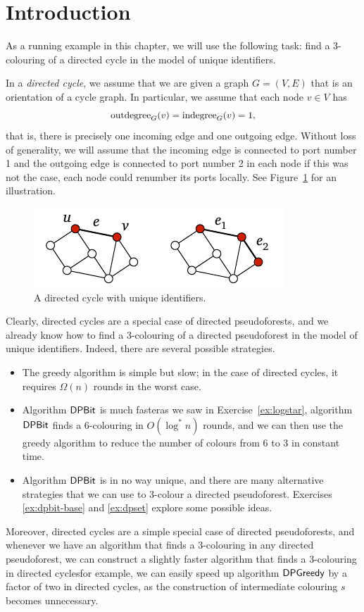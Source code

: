 \section{Introduction}

As a running example in this chapter, we will use the following task: find a $3$-colouring of a directed cycle in the model of unique identifiers.

In a \emph{directed cycle}, we assume that we are given a graph $G = (V,E)$ that is an orientation of a cycle graph. In particular, we assume that each node $v \in V$ has
\[
    \operatorname{outdegree}_G(v) = \operatorname{indegree}_G(v) = 1,
\]
that is, there is precisely one incoming edge and one outgoing edge. Without loss of generality, we will assume that the incoming edge is connected to port number 1 and the outgoing edge is connected to port number 2 in each node \mydash if this was not the case, each node could renumber its ports locally. See Figure~\ref{fig:directed-cycle} for an illustration.

\begin{figure}
    \centering
    \includegraphics[page=\PDirectedCycle]{figs.pdf}
    \caption{A directed cycle with unique identifiers.}\label{fig:directed-cycle}
\end{figure}

Clearly, directed cycles are a special case of directed pseudoforests, and we already know how to find a $3$-colouring of a directed pseudoforest in the model of unique identifiers. Indeed, there are several possible strategies.
\begin{itemize}
    \item The greedy algorithm is simple but slow; in the case of directed cycles, it requires $\Omega(n)$ rounds in the worst case.
    \item Algorithm $\textsf{DPBit}$ is much faster\mydash as we saw in Exercise~\ref{ex:logstar}, algorithm $\textsf{DPBit}$ finds a $6$-colouring in $O(\log^* n)$ rounds, and we can then use the greedy algorithm to reduce the number of colours from $6$ to $3$ in constant time.
    \item Algorithm $\textsf{DPBit}$ is in no way unique, and there are many alternative strategies that we can use to $3$-colour a directed pseudoforest. Exercises \ref{ex:dpbit-base} and \ref{ex:dpset} explore some possible ideas.
\end{itemize}
Moreover, directed cycles are a simple special case of directed pseudoforests, and whenever we have an algorithm that finds a $3$-colouring in any directed pseudoforest, we can construct a slightly faster algorithm that finds a $3$-colouring in directed cycles\mydash for example, we can easily speed up algorithm $\textsf{DPGreedy}$ by a factor of two in directed cycles, as the construction of intermediate colouring $s$ becomes unnecessary.

